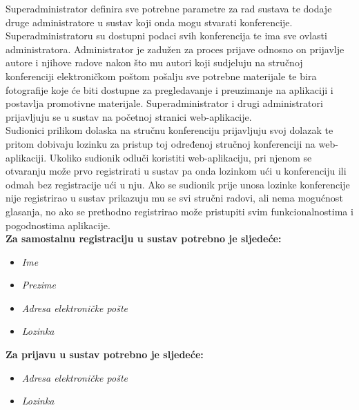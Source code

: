 		Superadministrator definira sve potrebne parametre za rad sustava te dodaje druge administratore u sustav koji onda mogu stvarati konferencije. Superadministratoru su dostupni podaci svih konferencija te ima sve ovlasti administratora. Administrator je zadužen za proces prijave odnosno on prijavlje autore i njihove radove nakon što mu autori koji sudjeluju na stručnoj konferenciji elektroničkom poštom pošalju sve potrebne materijale te bira fotografije koje će biti dostupne za pregledavanje i preuzimanje na aplikaciji i postavlja promotivne materijale. Superadministrator i drugi administratori prijavljuju se u sustav na početnoj stranici web-aplikacije.\\
		
		Sudionici prilikom dolaska na stručnu konferenciju prijavljuju svoj dolazak te pritom dobivaju lozinku za pristup toj određenoj stručnoj konferenciji na web-aplikaciji. Ukoliko sudionik odluči koristiti web-aplikaciju, pri njenom se otvaranju može prvo registrirati u sustav pa onda lozinkom ući u konferenciju ili odmah bez registracije ući u nju. Ako se sudionik prije unosa lozinke konferencije nije registrirao u sustav prikazuju mu se svi stručni radovi, ali nema mogućnost glasanja, no ako se prethodno registrirao može pristupiti svim funkcionalnostima i pogodnostima aplikacije.\\

        \textbf{Za samostalnu registraciju u sustav potrebno je sljedeće:}
        \begin{itemize}
        	\item \textit{Ime}
        	\item \textit{Prezime}
        	\item \textit{Adresa elektroničke pošte}
        	\item \textit{Lozinka}
        \end{itemize}

		\textbf{Za prijavu u sustav potrebno je sljedeće:}
        \begin{itemize}
            \item \textit{Adresa elektroničke pošte}
            \item \textit{Lozinka}
        \end{itemize}
        
